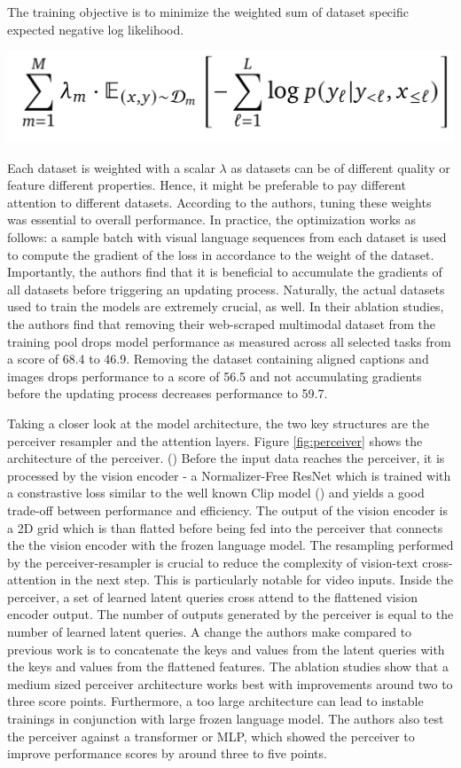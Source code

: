\documentclass[
]{krantz}
\begin{document}
The training objective is to minimize the weighted sum of dataset specific expected negative log likelihood.

\begin{center}\includegraphics[width=0.5\linewidth]{figures/05-chapter2/dataseteq} \end{center}

Each dataset is weighted with a scalar \(\lambda\) as datasets can be of different quality or feature different properties.
Hence, it might be preferable to pay different attention to different datasets. According to the authors, tuning these weights was essential to overall performance. In practice, the optimization works as follows:
a sample batch with visual language sequences from each dataset is used to compute the gradient of the loss in accordance to the weight of the dataset. Importantly, the authors find that it is beneficial to accumulate
the gradients of all datasets before triggering an updating process. Naturally, the actual datasets used to train the models are extremely crucial, as well. In their ablation studies, the authors find that
removing their web-scraped multimodal dataset from the training pool drops model performance as measured across all selected tasks from a score of 68.4 to 46.9. Removing the dataset containing aligned captions and images
drops performance to a score of 56.5 and not accumulating gradients before the updating process decreases performance to 59.7.

Taking a closer look at the model architecture, the two key structures are the perceiver resampler and the attention layers. Figure \ref{fig:perceiver} shows the architecture of the perceiver. (\citet{jaegle2021perceiver})
Before the input data reaches the perceiver, it is processed by the vision encoder - a Normalizer-Free ResNet which is trained with a constrastive loss similar to the well known Clip model (\citet{radford2021learning}) and yields a good trade-off between
performance and efficiency. The output of the vision encoder is a 2D grid which is than flatted before being fed into the perceiver that connects the the vision encoder with the frozen language model. The resampling
performed by the perceiver-resampler is crucial to reduce the complexity of vision-text cross-attention in the next step. This is particularly notable for video inputs. Inside the perceiver, a set
of learned latent queries cross attend to the flattened vision encoder output. The number of outputs generated by the perceiver is equal to the number of learned latent queries. A change the authors make compared
to previous work is to concatenate the keys and values from the latent queries with the keys and values from the flattened features. The ablation studies show that a medium sized perceiver architecture works best with
improvements around two to three score points. Furthermore, a too large architecture can lead to instable trainings in conjunction with large frozen language model. The authors also test the perceiver against a transformer or MLP,
which showed the perceiver to improve performance scores by around three to five points.
\end{document}
